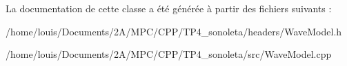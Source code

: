 La documentation de cette classe a été générée à partir des fichiers suivants \+:\begin{DoxyCompactItemize}
\item 
/home/louis/\+Documents/2\+A/\+M\+P\+C/\+C\+P\+P/\+T\+P4\+\_\+sonoleta/headers/Wave\+Model.\+h\item 
/home/louis/\+Documents/2\+A/\+M\+P\+C/\+C\+P\+P/\+T\+P4\+\_\+sonoleta/src/Wave\+Model.\+cpp\end{DoxyCompactItemize}

